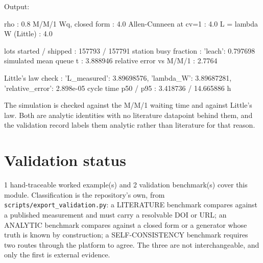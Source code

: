 \documentclass[10pt,a4paper,twoside]{report}
\begin{document}
{\footnotesize\color{slate}Output:\par}

\begin{outputblock}
rho                     : 0.8
M/M/1 Wq, closed form   : 4.0
Allen-Cunneen at cv=1   : 4.0
L = lambda W (Little)   : 4.0

lots started / shipped  : 157793 / 157791
station busy fraction   : {'leach': 0.797698}
simulated mean queue t  : 3.888946
relative error vs M/M/1 : 2.7764%

Little's law check      : {'L_measured': 3.89698576, 'lambda_W': 3.89687281, 'relative_error': 2.898e-05}
cycle time p50 / p95    : 3.418736 / 14.665886 h
\end{outputblock}

The simulation is checked against the M/M/1 waiting time and against Little's law. Both are analytic identities with no literature datapoint behind them, and the validation record labels them analytic rather than literature for that reason.

\section{Validation status}

1 hand-traceable worked example(s) and 2 validation benchmark(s) cover this module. Classification is the repository's own, from \texttt{scripts/export\_validation.py}: a LITERATURE benchmark compares against a published measurement and must carry a resolvable DOI or URL; an ANALYTIC benchmark compares against a closed form or a generator whose truth is known by construction; a SELF-CONSISTENCY benchmark requires two routes through the platform to agree. The three are not interchangeable, and only the first is external evidence.

\footnotesize
\end{document}
